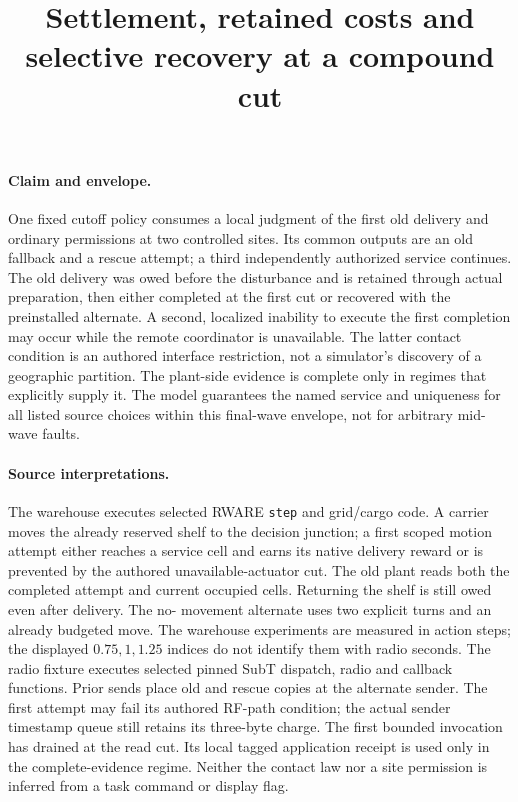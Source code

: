 \documentclass{article}
\title{Settlement, retained costs and selective recovery at a compound cut}
\author{}\date{}
\begin{document}
\maketitle

\paragraph{Claim and envelope.}
One fixed cutoff policy consumes a local judgment of the first old delivery
and ordinary permissions at two controlled sites. Its common outputs are an
old fallback and a rescue attempt; a third independently authorized service
continues. The old delivery was owed before the disturbance and is retained
through actual preparation, then either completed at the first cut or
recovered with the preinstalled alternate. A second, localized inability to
execute the first completion may occur while the remote coordinator is
unavailable. The latter contact condition is an authored interface restriction,
not a simulator's discovery of a geographic partition. The plant-side
evidence is complete only in regimes that explicitly supply it. The model
guarantees the named service and uniqueness for all listed source choices
within this final-wave envelope, not for arbitrary mid-wave faults.

\paragraph{Source interpretations.}
The warehouse executes selected RWARE \texttt{step} and grid/cargo code.
A carrier moves the already reserved shelf to the decision junction; a
first scoped motion attempt either reaches a service cell and earns its
native delivery reward or is prevented by the authored unavailable-actuator
cut. The old plant reads both the completed attempt and current occupied
cells. Returning the shelf is still owed even after delivery. The no-
movement alternate uses two explicit turns and an already budgeted move.
The warehouse experiments are measured in action steps; the displayed
$0.75,1,1.25$ indices do not identify them with radio seconds.
The radio fixture executes selected pinned SubT dispatch, radio and callback
functions. Prior sends place old and rescue copies at the alternate sender.
The first attempt may fail its authored RF-path condition; the actual
sender timestamp queue still retains its three-byte charge. The first bounded
invocation has drained at the read cut. Its local tagged application receipt
is used only in the complete-evidence regime. Neither the contact law nor a
site permission is inferred from a task command or display flag.
\end{document}
